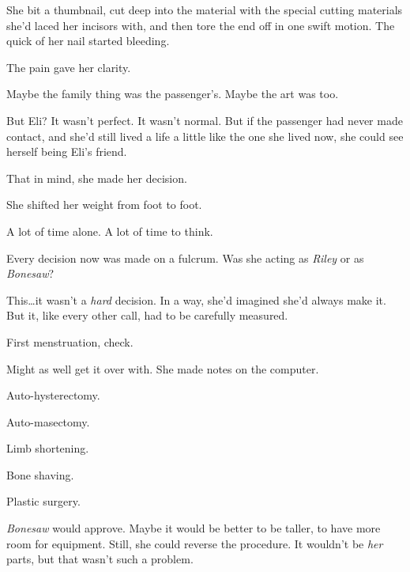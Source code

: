 She bit a thumbnail, cut deep into the material with the special cutting materials she'd laced her incisors with, and then tore the end off in one swift motion.  The quick of her nail started bleeding.



The pain gave her clarity.



Maybe the family thing was the passenger's.  Maybe the art was too.



But Eli?  It wasn't perfect.  It wasn't normal.  But if the passenger had never made contact, and she'd still lived a life a little like the one she lived now, she could see herself being Eli's friend.



That in mind, she made her decision.



\blacksquare






She shifted her weight from foot to foot.



A lot of time alone.  A lot of time to think.



Every decision now was made on a fulcrum.  Was she acting as \emph{Riley} or as \emph{Bonesaw}?



This\ldots it wasn't a \emph{hard} decision.  In a way, she'd imagined she'd always make it.  But it, like every other call, had to be carefully measured.



First menstruation, check.



Might as well get it over with.  She made notes on the computer.



Auto-hysterectomy.



Auto-masectomy.



Limb shortening.



Bone shaving.



Plastic surgery.



\emph{Bonesaw} would approve.  Maybe it would be better to be taller, to have more room for equipment.  Still, she could reverse the procedure.  It wouldn't be \emph{her} parts, but that wasn't such a problem.



